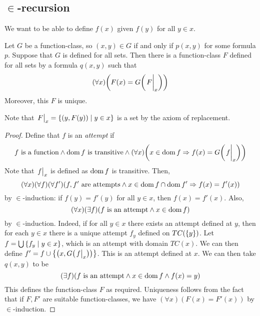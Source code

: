 \subsection{\texorpdfstring{\( \in \)}{∈}-recursion}
We want to be able to define \( f(x) \) given \( f(y) \) for all \( y \in x \).
\begin{theorem}
    Let \( G \) be a function-class, so \( (x,y) \in G \) if and only if \( p(x,y) \) for some formula \( p \).
    Suppose that \( G \) is defined for all sets.
    Then there is a function-class \( F \) defined for all sets by a formula \( q(x,y) \) such that
    \[ (\forall x)\qty(F(x) = G\qty(\eval{F}_x)) \]
    Moreover, this \( F \) is unique.
\end{theorem}
Note that \( \eval{F}_x = \qty{(y, F(y)) \mid y \in x} \) is a set by the axiom of replacement.
\begin{proof}
    Define that \( f \) is an \emph{attempt} if
    \[ f \text{ is a function} \wedge \dom f \text{ is transitive} \wedge (\forall x)\qty(x \in \dom f \Rightarrow f(x) = G\qty(\eval{f}_x)) \]
    Note that \( \eval{f}_x \) is defined as \( \operatorname{dom} f \) is transitive.
    Then,
    \[ (\forall x)(\forall f)(\forall f')(f, f' \text{ are attempts} \wedge x \in \operatorname{dom} f \cap \operatorname{dom} f' \Rightarrow f(x) = f'(x)) \]
    by \( \in \)-induction: if \( f(y) = f'(y) \) for all \( y \in x \), then \( f(x) = f'(x) \).
    Also,
    \[ (\forall x)(\exists f)(f \text{ is an attempt} \wedge x \in \operatorname{dom} f) \]
    by \( \in \)-induction.
    Indeed, if for all \( y \in x \) there exists an attempt defined at \( y \), then for each \( y \in x \) there is a unique attempt \( f_y \) defined on \( TC(\qty{y}) \).
    Let \( f = \bigcup\qty{f_y \mid y \in x} \), which is an attempt with domain \( TC(x) \).
    We can then define \( f' = f \cup \qty{\qty(x, G\qty(\eval{f}_x))} \).
    This is an attempt defined at \( x \).
    We can then take \( q(x,y) \) to be
    \[ (\exists f)(f \text{ is an attempt} \wedge x \in \operatorname{dom} f \wedge f(x) = y) \]
    This defines the function-class \( F \) as required.
    Uniqueness follows from the fact that if \( F, F' \) are suitable function-classes, we have \( (\forall x)(F(x) = F'(x)) \) by \( \in \)-induction.
\end{proof}

